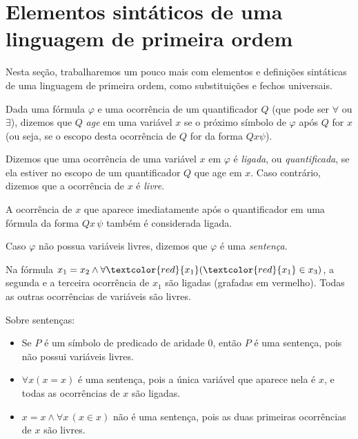 \section{Elementos sintáticos de uma linguagem de primeira ordem}\label{sec:elementosSintaticosPrimeiraOrdem}

Nesta seção, trabalharemos um pouco mais com elementos e definições sintáticas de uma linguagem de primeira ordem, como substituições e fechos universais.

\begin{metadefinition}\label{mdef:variaveisLigadasELivres}
    Dada uma fórmula $\varphi$ e uma ocorrência de um quantificador $Q$ (que pode ser $\forall$ ou $\exists$), dizemos que $Q$ \emph{age} em uma variável $x$ se o próximo símbolo de $\varphi$ após $Q$ for $x$ (ou seja, se o escopo desta ocorrência de $Q$ for da forma $Q x \psi$).

    Dizemos que uma ocorrência de uma variável $x$ em $\varphi$ é \emph{ligada}, ou \emph{quantificada}, se ela estiver no escopo de um quantificador $Q$ que age em $x$.
    Caso contrário, dizemos que a ocorrência de $x$ é \emph{livre}.

    A ocorrência de $x$ que aparece imediatamente após o quantificador em uma fórmula da forma $Qx\,\psi$ também é considerada ligada.

    Caso $\varphi$ não possua variáveis livres, dizemos que $\varphi$ é uma \emph{sentença}.
\end{metadefinition}

\begin{example}\label{exa:variaveisLigadasELivres}
    Na fórmula $x_1 = x_2 \wedge \forall \textcolor{red}{x_1} (\textcolor{red}{x_1} \in x_3)$, a segunda e a terceira ocorrência de $x_1$ são ligadas (grafadas em vermelho).
    Todas as outras ocorrências de variáveis são livres.
\end{example}

\begin{example}\label{exa:sentencas}Sobre sentenças:
\begin{itemize}
        \item Se $P$ é um símbolo de predicado de aridade $0$, então $P$ é uma sentença, pois não possui variáveis livres.
    
        \item $\forall x (x = x)$ é uma sentença, pois a única variável que aparece nela é $x$, e todas as ocorrências de $x$ são ligadas.
    
        \item $x = x \wedge \forall x \,(x \in x)$ não é uma sentença, pois as duas primeiras ocorrências de $x$ são livres.
\end{itemize}
\end{example}

